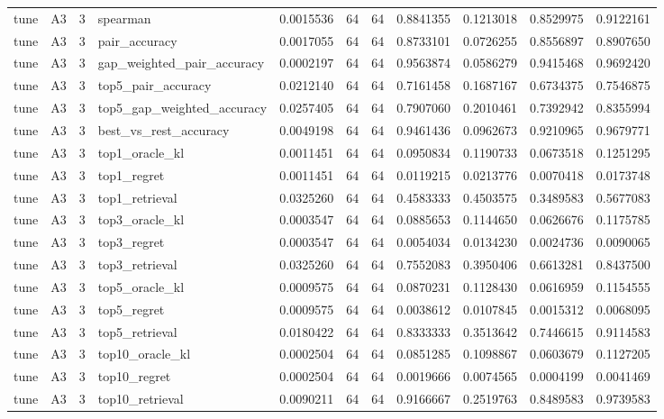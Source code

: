 \begin{tabular}{llrlrrrrrrr}
tune & A3 & 3 & spearman & 0.0015536 & 64 & 64 & 0.8841355 & 0.1213018 & 0.8529975 & 0.9122161 \\
tune & A3 & 3 & pair_accuracy & 0.0017055 & 64 & 64 & 0.8733101 & 0.0726255 & 0.8556897 & 0.8907650 \\
tune & A3 & 3 & gap_weighted_pair_accuracy & 0.0002197 & 64 & 64 & 0.9563874 & 0.0586279 & 0.9415468 & 0.9692420 \\
tune & A3 & 3 & top5_pair_accuracy & 0.0212140 & 64 & 64 & 0.7161458 & 0.1687167 & 0.6734375 & 0.7546875 \\
tune & A3 & 3 & top5_gap_weighted_accuracy & 0.0257405 & 64 & 64 & 0.7907060 & 0.2010461 & 0.7392942 & 0.8355994 \\
tune & A3 & 3 & best_vs_rest_accuracy & 0.0049198 & 64 & 64 & 0.9461436 & 0.0962673 & 0.9210965 & 0.9679771 \\
tune & A3 & 3 & top1_oracle_kl & 0.0011451 & 64 & 64 & 0.0950834 & 0.1190733 & 0.0673518 & 0.1251295 \\
tune & A3 & 3 & top1_regret & 0.0011451 & 64 & 64 & 0.0119215 & 0.0213776 & 0.0070418 & 0.0173748 \\
tune & A3 & 3 & top1_retrieval & 0.0325260 & 64 & 64 & 0.4583333 & 0.4503575 & 0.3489583 & 0.5677083 \\
tune & A3 & 3 & top3_oracle_kl & 0.0003547 & 64 & 64 & 0.0885653 & 0.1144650 & 0.0626676 & 0.1175785 \\
tune & A3 & 3 & top3_regret & 0.0003547 & 64 & 64 & 0.0054034 & 0.0134230 & 0.0024736 & 0.0090065 \\
tune & A3 & 3 & top3_retrieval & 0.0325260 & 64 & 64 & 0.7552083 & 0.3950406 & 0.6613281 & 0.8437500 \\
tune & A3 & 3 & top5_oracle_kl & 0.0009575 & 64 & 64 & 0.0870231 & 0.1128430 & 0.0616959 & 0.1154555 \\
tune & A3 & 3 & top5_regret & 0.0009575 & 64 & 64 & 0.0038612 & 0.0107845 & 0.0015312 & 0.0068095 \\
tune & A3 & 3 & top5_retrieval & 0.0180422 & 64 & 64 & 0.8333333 & 0.3513642 & 0.7446615 & 0.9114583 \\
tune & A3 & 3 & top10_oracle_kl & 0.0002504 & 64 & 64 & 0.0851285 & 0.1098867 & 0.0603679 & 0.1127205 \\
tune & A3 & 3 & top10_regret & 0.0002504 & 64 & 64 & 0.0019666 & 0.0074565 & 0.0004199 & 0.0041469 \\
tune & A3 & 3 & top10_retrieval & 0.0090211 & 64 & 64 & 0.9166667 & 0.2519763 & 0.8489583 & 0.9739583 \\

\end{tabular}
